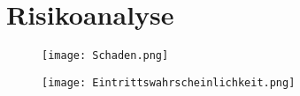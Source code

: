 \section{Risikoanalyse}
\begin{figure}[H]
	\centering
	\texttt{[image: Schaden.png]}
	\label{fig:Schaden}
\end{figure}

\begin{figure}[H]
	\centering
	\texttt{[image: Eintrittswahrscheinlichkeit.png]}
	\label{fig:Eintrittswahrscheinlichkeit}
\end{figure}
\newpage

\renewcommand{\arraystretch}{2}
\newcommand{\HY}{\hyphenpenalty = 25\exhyphenpenalty = 25}
